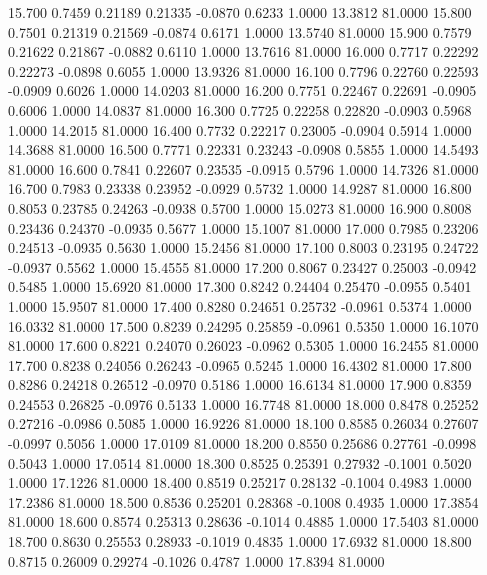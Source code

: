   15.700   0.7459   0.21189   0.21335  -0.0870   0.6233   1.0000  13.3812  81.0000
  15.800   0.7501   0.21319   0.21569  -0.0874   0.6171   1.0000  13.5740  81.0000
  15.900   0.7579   0.21622   0.21867  -0.0882   0.6110   1.0000  13.7616  81.0000
  16.000   0.7717   0.22292   0.22273  -0.0898   0.6055   1.0000  13.9326  81.0000
  16.100   0.7796   0.22760   0.22593  -0.0909   0.6026   1.0000  14.0203  81.0000
  16.200   0.7751   0.22467   0.22691  -0.0905   0.6006   1.0000  14.0837  81.0000
  16.300   0.7725   0.22258   0.22820  -0.0903   0.5968   1.0000  14.2015  81.0000
  16.400   0.7732   0.22217   0.23005  -0.0904   0.5914   1.0000  14.3688  81.0000
  16.500   0.7771   0.22331   0.23243  -0.0908   0.5855   1.0000  14.5493  81.0000
  16.600   0.7841   0.22607   0.23535  -0.0915   0.5796   1.0000  14.7326  81.0000
  16.700   0.7983   0.23338   0.23952  -0.0929   0.5732   1.0000  14.9287  81.0000
  16.800   0.8053   0.23785   0.24263  -0.0938   0.5700   1.0000  15.0273  81.0000
  16.900   0.8008   0.23436   0.24370  -0.0935   0.5677   1.0000  15.1007  81.0000
  17.000   0.7985   0.23206   0.24513  -0.0935   0.5630   1.0000  15.2456  81.0000
  17.100   0.8003   0.23195   0.24722  -0.0937   0.5562   1.0000  15.4555  81.0000
  17.200   0.8067   0.23427   0.25003  -0.0942   0.5485   1.0000  15.6920  81.0000
  17.300   0.8242   0.24404   0.25470  -0.0955   0.5401   1.0000  15.9507  81.0000
  17.400   0.8280   0.24651   0.25732  -0.0961   0.5374   1.0000  16.0332  81.0000
  17.500   0.8239   0.24295   0.25859  -0.0961   0.5350   1.0000  16.1070  81.0000
  17.600   0.8221   0.24070   0.26023  -0.0962   0.5305   1.0000  16.2455  81.0000
  17.700   0.8238   0.24056   0.26243  -0.0965   0.5245   1.0000  16.4302  81.0000
  17.800   0.8286   0.24218   0.26512  -0.0970   0.5186   1.0000  16.6134  81.0000
  17.900   0.8359   0.24553   0.26825  -0.0976   0.5133   1.0000  16.7748  81.0000
  18.000   0.8478   0.25252   0.27216  -0.0986   0.5085   1.0000  16.9226  81.0000
  18.100   0.8585   0.26034   0.27607  -0.0997   0.5056   1.0000  17.0109  81.0000
  18.200   0.8550   0.25686   0.27761  -0.0998   0.5043   1.0000  17.0514  81.0000
  18.300   0.8525   0.25391   0.27932  -0.1001   0.5020   1.0000  17.1226  81.0000
  18.400   0.8519   0.25217   0.28132  -0.1004   0.4983   1.0000  17.2386  81.0000
  18.500   0.8536   0.25201   0.28368  -0.1008   0.4935   1.0000  17.3854  81.0000
  18.600   0.8574   0.25313   0.28636  -0.1014   0.4885   1.0000  17.5403  81.0000
  18.700   0.8630   0.25553   0.28933  -0.1019   0.4835   1.0000  17.6932  81.0000
  18.800   0.8715   0.26009   0.29274  -0.1026   0.4787   1.0000  17.8394  81.0000
